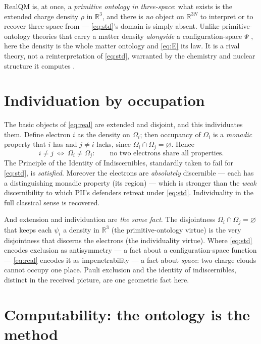 \documentclass[11pt]{article}
\begin{document}
RealQM is, at once, a \emph{primitive ontology in three-space}: what exists is the extended charge density
$\rho$ in $\mathbb R^3$, and there is \emph{no} object on $\mathbb R^{3N}$ to interpret or to recover
three-space from --- \eqref{eq:std}'s domain is simply absent. Unlike primitive-ontology theories that
carry a matter density \emph{alongside} a configuration-space $\Psi$ \cite{Allori2013}, here the density is
the whole matter ontology and \eqref{eq:E} its law. It is a rival theory, not a reinterpretation of
\eqref{eq:std}, warranted by the chemistry and nuclear structure it computes \cite{RealQM}.

\section{Individuation by occupation}
\label{sec:ind}

The basic objects of \eqref{eq:real} are extended and disjoint, and this individuates them. Define electron
$i$ as the density on $\Omega_i$; then occupancy of $\Omega_i$ is a \emph{monadic} property that $i$ has
and $j\neq i$ lacks, since $\Omega_i\cap\Omega_j=\varnothing$. Hence
\begin{equation}
i\neq j\ \Longleftrightarrow\ \Omega_i\neq\Omega_j:\qquad
\text{no two electrons share all properties.}
\end{equation}
The Principle of the Identity of Indiscernibles, standardly taken to fail for \eqref{eq:std}, is
\emph{satisfied}. Moreover the electrons are \emph{absolutely} discernible --- each has a distinguishing
monadic property (its region) --- which is stronger than the \emph{weak} discernibility
\cite{MullerSaunders2008} to which PII's defenders retreat under \eqref{eq:std}. Individuality in the full
classical sense is recovered.

And extension and individuation are \emph{the same fact}. The disjointness $\Omega_i\cap\Omega_j=\varnothing$
that keeps each $\psi_i$ a density in $\mathbb R^3$ (the primitive-ontology virtue) is the very disjointness
that discerns the electrons (the individuality virtue). Where \eqref{eq:std} encodes exclusion as
antisymmetry --- a fact about a configuration-space function --- \eqref{eq:real} encodes it as
impenetrability --- a fact about \emph{space}: two charge clouds cannot occupy one place. Pauli exclusion
and the identity of indiscernibles, distinct in the received picture, are one geometric fact here.

\section{Computability: the ontology is the method}
\label{sec:comp}
\end{document}
